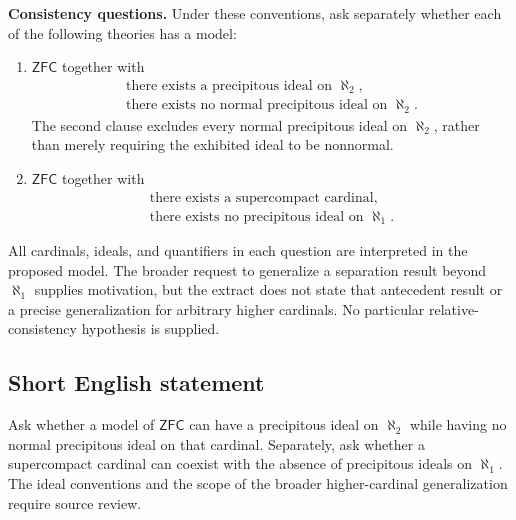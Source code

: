 \documentclass[11pt]{article}
\begin{document}
\textbf{Consistency questions.} Under these conventions, ask separately whether each of the following theories has a model:
\begin{enumerate}
\item \(\mathsf{ZFC}\) together with
\[
\begin{gathered}
\text{there exists a precipitous ideal on }\aleph_2,\\
\text{there exists no normal precipitous ideal on }\aleph_2.
\end{gathered}
\]
The second clause excludes every normal precipitous ideal on \(\aleph_2\), rather than merely requiring the exhibited ideal to be nonnormal.
\item \(\mathsf{ZFC}\) together with
\[
\begin{gathered}
\text{there exists a supercompact cardinal},\\
\text{there exists no precipitous ideal on }\aleph_1.
\end{gathered}
\]
\end{enumerate}
All cardinals, ideals, and quantifiers in each question are interpreted in the proposed model. The broader request to generalize a separation result beyond \(\aleph_1\) supplies motivation, but the extract does not state that antecedent result or a precise generalization for arbitrary higher cardinals. No particular relative-consistency hypothesis is supplied.
\subsection{Short English statement}
Ask whether a model of \(\mathsf{ZFC}\) can have a precipitous ideal on \(\aleph_2\) while having no normal precipitous ideal on that cardinal. Separately, ask whether a supercompact cardinal can coexist with the absence of precipitous ideals on \(\aleph_1\). The ideal conventions and the scope of the broader higher-cardinal generalization require source review.
\end{document}
